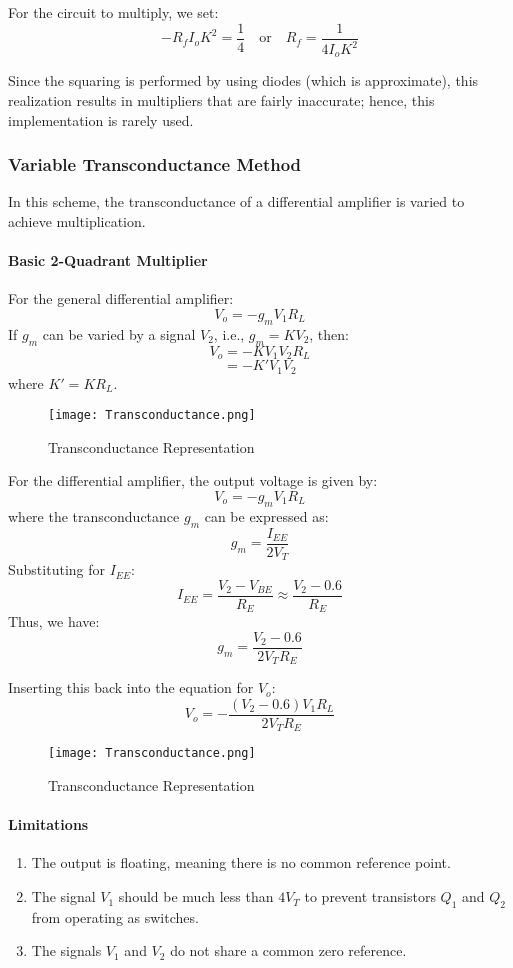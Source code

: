 \documentclass[a4paper,9pt,twoside,openany,twocolumn]{memoir}
\begin{document}
For the circuit to multiply, we set:
\[
-R_f I_o K^2 = \frac{1}{4} \quad \text{or} \quad R_f = \frac{1}{4 I_o K^2} \tag{22}
\]

Since the squaring is performed by using diodes (which is approximate), this realization results in multipliers that are fairly inaccurate; hence, this implementation is rarely used.

\subsubsection{Variable Transconductance Method}
In this scheme, the transconductance of a differential amplifier is varied to achieve multiplication.

\paragraph{Basic 2-Quadrant Multiplier}
For the general differential amplifier:
\[
V_o = -g_m V_1 R_L \tag{23}
\]
If \( g_m \) can be varied by a signal \( V_2 \), i.e., \( g_m = K V_2 \), then:
\[
V_o = -K V_1 V_2 R_L \tag{24}
\]
\[
= -K' V_1 V_2 \tag{25}
\]
where \( K' = KR_L \).
\begin{figure}[h]
    \centering
    \texttt{[image: Transconductance.png]} %
    \caption{Transconductance Representation}
    \label{fig:transconductance}
\end{figure}
For the differential amplifier, the output voltage is given by:
\[
V_o = -g_m V_1 R_L \tag{26}
\]
where the transconductance \( g_m \) can be expressed as:
\[
g_m = \frac{I_{EE}}{2V_T} \tag{27}
\]
Substituting for \( I_{EE} \):
\[
I_{EE} = \frac{V_2 - V_{BE}}{R_E} \approx \frac{V_2 - 0.6}{R_E} \tag{28}
\]
Thus, we have:
\[
g_m = \frac{V_2 - 0.6}{2V_T R_E} \tag{29}
\]

Inserting this back into the equation for \( V_o \):
\[
V_o = -\frac{(V_2 - 0.6)V_1 R_L}{2V_T R_E} \tag{30}
\]
\begin{figure}[h]
    \centering
    \texttt{[image: Transconductance.png]} %
    \caption{Transconductance Representation}
    \label{fig:transconductance}
\end{figure}

\paragraph{Limitations}
\begin{enumerate}
    \item The output is floating, meaning there is no common reference point.
    \item The signal \( V_1 \) should be much less than \( 4V_T \) to prevent transistors \( Q_1 \) and \( Q_2 \) from operating as switches.
    \item The signals \( V_1 \) and \( V_2 \) do not share a common zero reference.
\end{enumerate}
\end{document}
